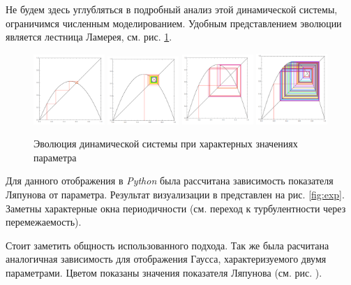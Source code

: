 Не будем здесь углубляться в подробный анализ этой динамической системы, ограничимся численным моделированием. Удобным представлением эволюции является лестница Ламерея, см. рис. \ref{fig:lbl}.
\begin{figure}
    \centering
    \includegraphics[width=0.24\textwidth]{img/25.png}
    \includegraphics[width=0.24\textwidth]{img/3.png}
    \includegraphics[width=0.24\textwidth]{img/355.png}
    \includegraphics[width=0.24\textwidth]{img/365.png}
    \caption{Эволюция динамической системы при характерных значениях параметра}
    \label{fig:lbl}
\end{figure}
Для данного отображения в \textit{Python} была рассчитана зависимость показателя Ляпунова от параметра. Результат визуализации в представлен на рис. \ref{fig:exp}. Заметны характерные окна периодичности (см. переход к турбулентности через перемежаемость).

Стоит заметить общность использованного подхода. Так же была расчитана аналогичная зависимость для отображения Гаусса, характеризуемого двумя параметрами. Цветом показаны значения показателя Ляпунова (см. рис. \label{fig:exp}).

